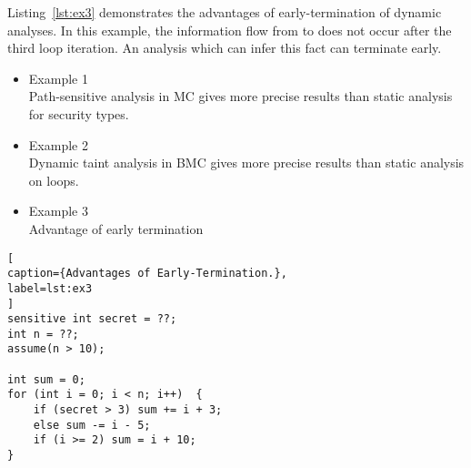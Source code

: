 Listing~\ref{lst:ex3} demonstrates the advantages of early-termination of dynamic analyses. In this example, the information flow from  to  does not occur after the third loop iteration. An analysis which can infer this fact can terminate early.

\begin{itemize}
\item Example 1 \\
Path-sensitive analysis in MC gives more precise results than static analysis for security types.


\item Example 2 \\
Dynamic taint analysis in BMC gives more precise results than static analysis on loops.

\item Example 3 \\
Advantage of early termination

\end{itemize}

\begin{lstlisting}[
caption={Advantages of Early-Termination.},
label=lst:ex3
]
sensitive int secret = ??;
int n = ??;
assume(n > 10);

int sum = 0;
for (int i = 0; i < n; i++)  {
	if (secret > 3) sum += i + 3;
	else sum -= i - 5;
	if (i >= 2)	sum = i + 10;
}
\end{lstlisting}


